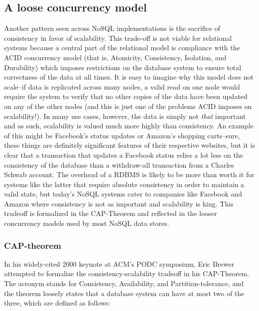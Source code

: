 \documentclass[11pt,a4paper]{report}
\begin{document}
\subsection{A loose concurrency model}
Another pattern seen across NoSQL implementations is the sacrifice of consistency in favor of scalability. This trade-off is not viable for relational systems because a central part of the relational model is compliance with the ACID concurrency model (that is, Atomicity, Consistency, Isolation, and Durability) which imposes restrictions on the database system to ensure total correctness of the data at all times. It is easy to imagine why this model does not scale--if data is replicated across many nodes, a valid read on one node would require the system to verify that no other copies of the data have been updated on any of the other nodes (and this is just one of the problems ACID imposes on scalability!).  In many use cases, however, the data is simply not \textit{that} important and as such, scalability is valued much more highly than consistency. An example of this might be Facebook's status updates or Amazon's shopping carts--sure, these things are definitely significant features of their respective websites, but it is clear that a transaction that updates a Facebook status relies a lot less on the consistency of the database than a withdraw-all transaction from a Charles Schwab account. The overhead of a RDBMS is likely to be more than worth it for systems like the latter that require absolute consistency in order to maintain a valid state, but today's NoSQL systems cater to companies like Facebook and Amazon where consistency is not as important and scalability is king. This tradeoff is formalized in the CAP-Theorem and reflected in the looser concurrency models used by most NoSQL data stores.

\subsubsection{CAP-theorem}
In his widely-cited 2000 keynote at ACM's PODC symposium, Eric Brewer attempted to formalize the consistency-scalability tradeoff in his CAP-Theorem.\cite{brewer2000towards} The acronym stands for Consistency, Availability, and Partition-tolerance, and the theorem loosely states that a database system can have at most two of the three, which are defined as follows:
\end{document}

